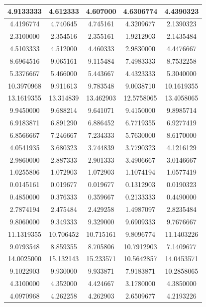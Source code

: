 \begin{longtable}{|c|c|c|c|c|}
    4.9133333 & 4.612333 & 4.607000 & 4.6306774 & 4.4390323 \\ \hline
    4.4196774 & 4.740645 & 4.745161 & 4.3209677 & 2.1390323 \\ \hline
    2.3100000 & 2.354516 & 2.355161 & 1.9212903 & 2.1435484 \\ \hline
    4.5103333 & 4.512000 & 4.460333 & 2.9830000 & 4.4476667 \\ \hline
    8.6964516 & 9.065161 & 9.115484 & 7.4983333 & 8.7532258 \\ \hline
    5.3376667 & 5.466000 & 5.443667 & 4.4323333 & 5.3040000 \\ \hline
    10.3970968 & 9.911613 & 9.783548 & 9.0038710 & 10.1619355 \\ \hline
    13.1619355 & 13.314839 & 13.462903 & 12.5758065 & 13.4058065 \\ \hline
    9.9450000 & 9.688214 & 9.641071 & 9.4150000 & 9.8985714 \\ \hline
    6.9183871 & 6.891290 & 6.886452 & 6.7719355 & 6.9277419 \\ \hline
    6.8566667 & 7.246667 & 7.234333 & 5.7630000 & 8.6170000 \\ \hline
    4.0541935 & 3.680323 & 3.744839 & 3.7790323 & 4.1216129 \\ \hline
    2.9860000 & 2.887333 & 2.901333 & 3.4906667 & 3.0146667 \\ \hline
    1.0255806 & 1.072903 & 1.072903 & 1.1074194 & 1.0577419 \\ \hline
    0.0145161 & 0.019677 & 0.019677 & 0.1312903 & 0.0190323 \\ \hline
    0.4850000 & 0.376333 & 0.359667 & 0.2133333 & 0.4490000 \\ \hline
    2.7874194 & 2.475484 & 2.429258 & 1.4987097 & 2.8235484 \\ \hline
    9.8060000 & 9.349333 & 9.329000 & 9.6909333 & 9.7676667 \\ \hline
    11.1319355 & 10.706452 & 10.715161 & 9.8096774 & 11.1403226 \\ \hline
    9.0793548 & 8.859355 & 8.705806 & 10.7912903 & 7.1409677 \\ \hline
    14.0025000 & 15.132143 & 15.233571 & 10.5642857 & 14.0453571 \\ \hline
    9.1022903 & 9.930000 & 9.933871 & 7.9183871 & 10.2858065 \\ \hline
    4.3100000 & 4.352000 & 4.424667 & 3.1780000 & 4.3850000 \\ \hline
    4.0970968 & 4.262258 & 4.262903 & 2.6509677 & 4.2193226 \\ \hline

\end{longtable}

